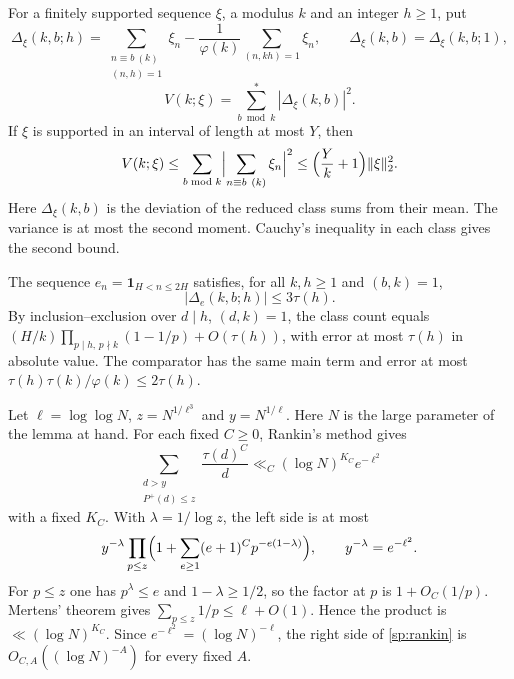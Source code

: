 For a finitely supported sequence $\xi$, a modulus $k$ and an integer
$h\ge1$, put
\begin{equation}\label{sp:disc}
 \Delta_\xi(k,b;h)=\sum_{\substack{n\equiv b\ (k)\\(n,h)=1}}\xi_n
 -\frac1{\varphi(k)}\sum_{(n,kh)=1}\xi_n,\qquad
 \Delta_\xi(k,b)=\Delta_\xi(k,b;1),
\end{equation}
\begin{equation}\label{sp:variance}
 V(k;\xi)=\sum_{b\bmod k}^{*}|\Delta_\xi(k,b)|^2 .
\end{equation}
If $\xi$ is supported in an interval of length at most $Y$, then
\begin{equation}\label{sp:projection}
 V(k;\xi)\le\sum_{b\bmod k}\Bigl|\sum_{n\equiv b\ (k)}\xi_n\Bigr|^2
 \le\Bigl(\frac Yk+1\Bigr)\|\xi\|_2^2 .
\end{equation}
Here $\Delta_\xi(k,b)$ is the deviation of the reduced class sums from
their mean. The variance is at most the second moment. Cauchy's
inequality in each class gives the second bound.

The sequence $e_n=\mathbf1_{H<n\le2H}$ satisfies, for all $k,h\ge1$ and
$(b,k)=1$,
\begin{equation}\label{sp:constant-sw}
 |\Delta_e(k,b;h)|\le3\tau(h).
\end{equation}
By inclusion--exclusion over $d\mid h$, $(d,k)=1$, the class count equals
$(H/k)\prod_{p\mid h,\,p\nmid k}(1-1/p)+O(\tau(h))$, with error at most
$\tau(h)$ in absolute value. The comparator has the same main term and error
at most $\tau(h)\tau(k)/\varphi(k)\le2\tau(h)$.

Let $\ell=\log\log N$, $z=N^{1/\ell^3}$ and $y=N^{1/\ell}$. Here $N$ is
the large parameter of the lemma at hand. For each fixed
$C\ge0$, Rankin's method gives
\begin{equation}\label{sp:rankin}
 \sum_{\substack{d>y\\P^+(d)\le z}}\frac{\tau(d)^C}d
 \ll_C(\log N)^{K_C}e^{-\ell^2}
\end{equation}
with a fixed $K_C$. With $\lambda=1/\log z$, the left side is at most
\[
 y^{-\lambda}\prod_{p\le z}\Bigl(1+\sum_{e\ge1}(e+1)^Cp^{-e(1-\lambda)}\Bigr),
 \qquad y^{-\lambda}=e^{-\ell^2}.
\]
For $p\le z$ one has $p^{\lambda}\le e$ and $1-\lambda\ge1/2$, so the factor
at $p$ is $1+O_C(1/p)$. Mertens' theorem gives
$\sum_{p\le z}1/p\le\ell+O(1)$. Hence the product is $\ll(\log N)^{K_C}$.
Since $e^{-\ell^2}=(\log N)^{-\ell}$, the right side of \eqref{sp:rankin}
is $O_{C,A}((\log N)^{-A})$ for every fixed $A$.

